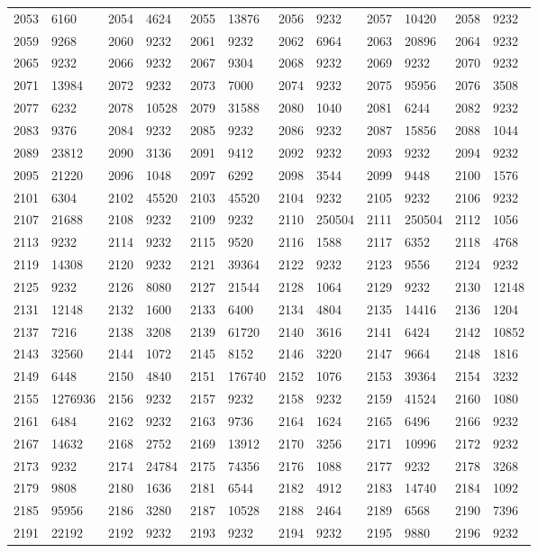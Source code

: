 \begin{longtable}{llllllllllll}
2053 & 6160&2054 &4624&2055& 13876&2056 &9232&2057 &10420&2058& 9232\\
2059 & 9268&2060 &9232&2061& 9232&2062 &6964&2063 &20896&2064& 9232\\
2065 & 9232&2066 &9232&2067& 9304&2068 &9232&2069 &9232&2070& 9232\\
2071 & 13984&2072 &9232&2073& 7000&2074 &9232&2075 &95956&2076& 3508\\
2077 & 6232&2078 &10528&2079& 31588&2080 &1040&2081 &6244&2082& 9232\\
2083 & 9376&2084 &9232&2085& 9232&2086 &9232&2087 &15856&2088& 1044\\
2089 & 23812&2090 &3136&2091& 9412&2092 &9232&2093 &9232&2094& 9232\\
2095 & 21220&2096 &1048&2097& 6292&2098 &3544&2099 &9448&2100& 1576\\
2101 & 6304&2102 &45520&2103& 45520&2104 &9232&2105 &9232&2106& 9232\\
2107 & 21688&2108 &9232&2109& 9232&2110 &250504&2111 &250504&2112& 1056\\
2113 & 9232&2114 &9232&2115& 9520&2116 &1588&2117 &6352&2118& 4768\\
2119 & 14308&2120 &9232&2121& 39364&2122 &9232&2123 &9556&2124& 9232\\
2125 & 9232&2126 &8080&2127& 21544&2128 &1064&2129 &9232&2130& 12148\\
2131 & 12148&2132 &1600&2133& 6400&2134 &4804&2135 &14416&2136& 1204\\
2137 & 7216&2138 &3208&2139& 61720&2140 &3616&2141 &6424&2142& 10852\\
2143 & 32560&2144 &1072&2145& 8152&2146 &3220&2147 &9664&2148& 1816\\
2149 & 6448&2150 &4840&2151& 176740&2152 &1076&2153 &39364&2154& 3232\\
2155 & 1276936&2156 &9232&2157& 9232&2158 &9232&2159 &41524&2160& 1080\\
2161 & 6484&2162 &9232&2163& 9736&2164 &1624&2165 &6496&2166& 9232\\
2167 & 14632&2168 &2752&2169& 13912&2170 &3256&2171 &10996&2172& 9232\\
2173 & 9232&2174 &24784&2175& 74356&2176 &1088&2177 &9232&2178& 3268\\
2179 & 9808&2180 &1636&2181& 6544&2182 &4912&2183 &14740&2184& 1092\\
2185 & 95956&2186 &3280&2187& 10528&2188 &2464&2189 &6568&2190& 7396\\
2191 & 22192&2192 &9232&2193& 9232&2194 &9232&2195 &9880&2196& 9232\\

\end{longtable}
